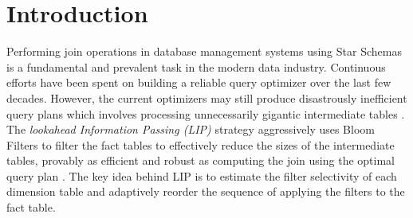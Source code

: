 \documentclass[10pt]{article}
\begin{document}
\newpage
\maketitle




\section{Introduction}

Performing join operations in database management systems using Star Schemas is a fundamental and prevalent task in the modern data industry. Continuous efforts have been spent on building a reliable query optimizer over the last few decades. However, the current optimizers may still produce disastrously inefficient query plans which involves processing unnecessarily gigantic intermediate tables \cite{leis2015good,rabl2013variations}. The \textit{lookahead Information Passing (LIP)} strategy aggressively uses Bloom Filters to filter the fact tables to effectively reduce the sizes of the intermediate tables, provably as efficient and robust as computing the join using the optimal query plan \cite{zhu2017looking}. The key idea behind LIP is to estimate the filter selectivity of each dimension table and adaptively reorder the sequence of applying the filters to the fact table. 
\end{document}
